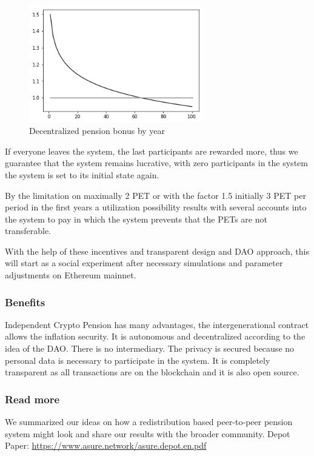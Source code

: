 \begin{figure}[H]
    \centering
    \includegraphics[width=3.0in]{img/pension_bonus.png}
    \caption{Decentralized pension bonus by year}
    \label{fig:pension_bonus}
\end{figure}

If everyone leaves the system, the last participants are rewarded more, thus we guarantee that the system remains lucrative, with zero participants in the system the system is set to its initial state again.

By the limitation on maximally 2 PET or with the factor 1.5 initially 3 PET per period in the first years a utilization possibility results with several accounts into the system to pay in which the system prevents that the PETs are not transferable. 

With the help of these incentives and transparent design and DAO approach, this will start as a social experiment after necessary simulations and parameter adjustments on Ethereum mainnet.

\subsubsection*{Benefits}
Independent Crypto Pension has many advantages, the intergenerational contract allows the inflation security. It is autonomous and decentralized according to the idea of the DAO. There is no intermediary.  The privacy is secured because no personal data is necessary to participate in the system.  It is completely transparent as all transactions are on the blockchain and it is also open source.

\subsubsection*{Read more}
We summarized our ideas on how a redistribution based peer-to-peer pension system might look and share our results with the broader community.
\newline
Depot Paper: \url{https://www.asure.network/asure.depot.en.pdf}

